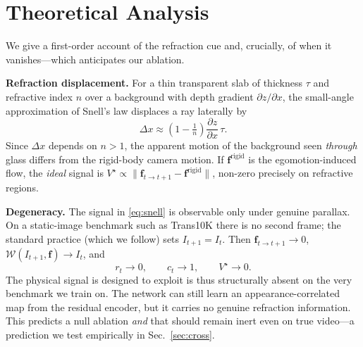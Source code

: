 \section{Theoretical Analysis}
\label{sec:theory}
We give a first-order account of the refraction cue and, crucially, of when it
vanishes---which anticipates our ablation.

\textbf{Refraction displacement.} For a thin transparent slab of thickness
$\tau$ and refractive index $n$ over a background with depth gradient
$\partial z/\partial x$, the small-angle approximation of Snell's law displaces a
ray laterally by
\begin{equation}
\Delta x \approx \left(1-\tfrac{1}{n}\right)\frac{\partial z}{\partial x}\,\tau .
\label{eq:snell}
\end{equation}
Since $\Delta x$ depends on $n>1$, the apparent motion of the background seen
\emph{through} glass differs from the rigid-body camera motion. If
$\mathbf{f}^{\mathrm{rigid}}$ is the egomotion-induced flow, the \emph{ideal}
\ofcv{} signal is $V^\star\propto\lVert\mathbf{f}_{t\to t+1}-\mathbf{f}^{\mathrm{rigid}}\rVert$,
non-zero precisely on refractive regions.

\textbf{Degeneracy.} The signal in \eqref{eq:snell} is observable only under
genuine parallax. On a static-image benchmark such as Trans10K there is no
second frame; the standard practice (which we follow) sets $I_{t+1}=I_t$. Then
$\mathbf{f}_{t\to t+1}\!\to\!0$, $\mathcal{W}(I_{t+1},\mathbf{f})\!\to\!I_t$, and
\begin{equation}
r_t\to 0,\qquad c_t\to 1,\qquad V^\star\to 0 .
\end{equation}
The physical signal \ofcv{} is designed to exploit is thus structurally absent
on the very benchmark we train on. The network can still learn an
appearance-correlated map from the residual encoder, but it carries no genuine
refraction information. This predicts a null ablation \emph{and} that \ofcv{}
should remain inert even on true video---a prediction we test empirically in
Sec.~\ref{sec:cross}.

